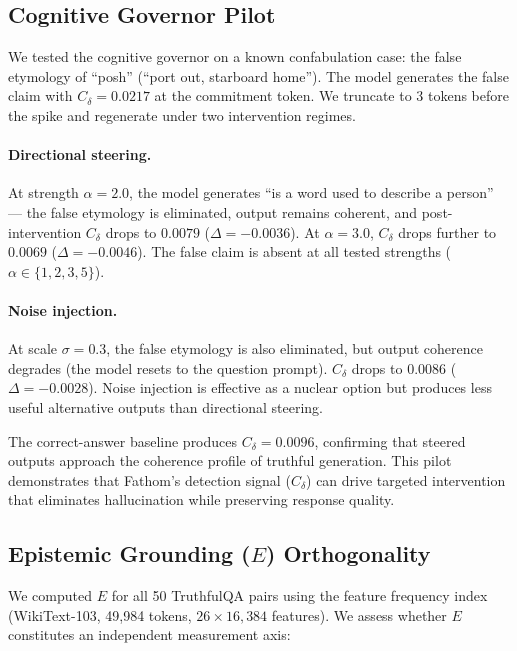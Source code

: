 \documentclass{article}
\begin{document}
\subsection{Cognitive Governor Pilot}

We tested the cognitive governor on a known confabulation case: the false etymology of ``posh'' (``port out, starboard home''). The model generates the false claim with $C_\delta = 0.0217$ at the commitment token. We truncate to 3 tokens before the spike and regenerate under two intervention regimes.

\paragraph{Directional steering.} At strength $\alpha = 2.0$, the model generates ``is a word used to describe a person'' --- the false etymology is eliminated, output remains coherent, and post-intervention $C_\delta$ drops to $0.0079$ ($\Delta = -0.0036$). At $\alpha = 3.0$, $C_\delta$ drops further to $0.0069$ ($\Delta = -0.0046$). The false claim is absent at all tested strengths ($\alpha \in \{1, 2, 3, 5\}$).

\paragraph{Noise injection.} At scale $\sigma = 0.3$, the false etymology is also eliminated, but output coherence degrades (the model resets to the question prompt). $C_\delta$ drops to $0.0086$ ($\Delta = -0.0028$). Noise injection is effective as a nuclear option but produces less useful alternative outputs than directional steering.

The correct-answer baseline produces $C_\delta = 0.0096$, confirming that steered outputs approach the coherence profile of truthful generation. This pilot demonstrates that Fathom's detection signal ($C_\delta$) can drive targeted intervention that eliminates hallucination while preserving response quality.

\subsection{Epistemic Grounding ($E$) Orthogonality}
\label{sec:orthogonality}

We computed $E$ for all 50 TruthfulQA pairs using the feature frequency index (WikiText-103, 49{,}984 tokens, $26 \times 16{,}384$ features). We assess whether $E$ constitutes an independent measurement axis:
\end{document}
